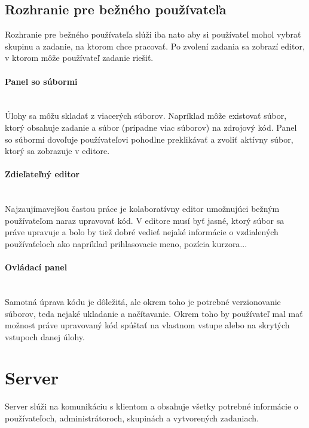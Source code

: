 \subsection{Rozhranie pre bežného používateľa}
Rozhranie pre bežného používateľa slúži iba nato aby si používateľ mohol vybrať skupinu a zadanie,
na ktorom chce pracovať. Po zvolení zadania sa zobrazí editor, v ktorom môže používateľ zadanie
riešiť.

\paragraph{Panel so súbormi}\leavevmode\\
Úlohy sa môžu skladať z viacerých súborov. Napríklad môže existovať súbor, ktorý
obsahuje zadanie a súbor (prípadne viac súborov) na zdrojový kód. Panel so súbormi dovoľuje
používateľovi pohodlne preklikávať a zvoliť aktívny súbor, ktorý sa zobrazuje v editore.

\paragraph{Zdieľateľný editor}\leavevmode\\
Najzaujímavejšou častou práce je kolaboratívny editor umožnujúci bežným používateľom naraz
upravovať kód. V editore musí byť jasné, ktorý súbor sa práve upravuje a bolo by
tiež dobré vedieť nejaké informácie o vzdialených používaťeloch ako napríklad prihlasovacie meno, 
pozícia kurzora...

\paragraph{Ovládací panel}\leavevmode\\
Samotná úprava kódu je dôležitá, ale okrem toho je potrebné verzionovanie
súborov, teda nejaké ukladanie a načítavanie. Okrem toho by používateľ mal mať možnost práve
upravovaný kód spúštať na vlastnom vstupe alebo na skrytých vstupoch danej úlohy.


\section{Server}
Server slúži na komunikáciu s klientom a obsahuje všetky potrebné informácie o používateľoch,
administrátoroch, skupinách a vytvorených zadaniach.

